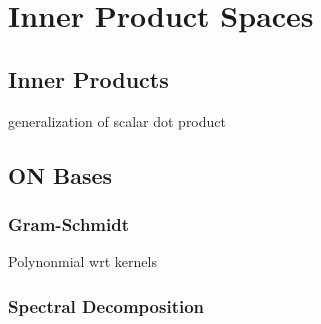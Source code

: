 \chapter{Inner Product Spaces}
\section{Inner Products}
generalization of scalar dot product
\section{ON Bases}
\subsection{Gram-Schmidt}
Polynonmial wrt kernels
\subsection{Spectral Decomposition}

